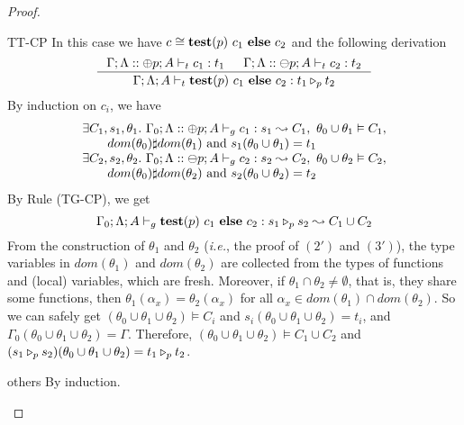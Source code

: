 {{{\begin{proof}
\begin{ProofEnumDesc}
\item[TT-CP] In this case we have $c\cong \lcCP{p}{c_1}{c_2}$ and the following derivation
\begin{equation*}
\inference
{\Gamma;\trace::\tplus p; A \vdash_{t} c_1 : t_1  &
\Gamma;\trace::\tminus p; A \vdash_{t} c_2 : t_2}
{\Gamma;\trace; A \vdash_{t} \lcCP{p}{c_1}{c_2} : \omerge{p}{t_1}{t_2}}
\end{equation*}
By induction on $c_i$, we have
\begin{equation*}
\begin{array}{l}
\exists C_1, s_1,\theta_1.~\Gamma_{0};\trace::\tplus p; A \vdash_{g} c_1 : s_1 \leadsto C_1,~ \theta_{0}\cup\theta_1 \vDash C_1,\\
\quad\quad dom(\theta_{0})\sharp dom(\theta_1)  \textrm{ and } s_1(\theta_{0}\cup\theta_{1}) = t_1\\
\exists C_2, s_2,\theta_2.~\Gamma_{0};\trace::\tminus p; A \vdash_{g} c_2 : s_2 \leadsto C_2,~ \theta_{0}\cup\theta_2 \vDash C_2, \\
\quad\quad dom(\theta_{0})\sharp dom(\theta_2)  \textrm{ and } s_2(\theta_{0}\cup\theta_{2}) = t_2\\
\end{array}
\end{equation*}
By Rule {(TG-CP)}, we get
\begin{equation*}
\Gamma_{0};\trace; A \vdash_{g} \lcCP{p}{c_1}{c_2} : \omerge{p}{s_1}{s_2}\leadsto C_1\cup C_2
\end{equation*}
From the construction of $\theta_1$ and $\theta_2$ (\emph{i.e.}, the proof of $(2')$ and $(3')$), the type variables in $dom(\theta_1)$ and $dom(\theta_2)$ are collected from the types of functions and (local) variables, which are fresh. Moreover, if $\theta_1 \cap \theta_2 \neq \emptyset$, that is, they share some functions, then $\theta_1(\alpha_x) = \theta_2(\alpha_x) $ for all $\alpha_x \in dom(\theta_1) \cap dom(\theta_2)$.
So we can safely get $(\theta_{0}\cup\theta_1\cup\theta_2) \vDash C_i$ and  $s_i(\theta_{0}\cup\theta_{1}\cup\theta_{2}) = t_i$, and $\Gamma_{0}(\theta_{0}\cup\theta_{1}\cup\theta_{2}) =\Gamma$.
Therefore, $(\theta_{0}\cup\theta_1\cup\theta_2) \vDash C_1\cup C_2$ and
$(\omerge{p}{s_1}{s_2})(\theta_{0}\cup\theta_{1}\cup\theta_{2}) = \omerge{p}{t_1}{t_2}$.

\item[others] By induction.

\end{ProofEnumDesc}


\end{proof}}}}
